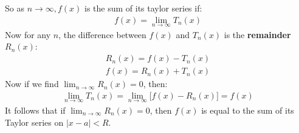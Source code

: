 \documentclass{article}
\begin{document}
So as $n \to \infty, f(x)$ is the sum of its taylor series if:
\begin{gather*}
    f(x) = \lim_{n \to \infty} T_n(x)
\end{gather*}
Now for any $n$, the difference between $f(x)$ and $T_n(x)$ is the \textbf{remainder} $R_n(x)$:
\begin{gather*}
    R_n(x) = f(x) - T_n(x)\\
    f(x) = R_n(x) + T_n(x)
\end{gather*}
Now if we find $\lim_{n \to \infty} R_n(x) = 0$, then:
\begin{gather*}
    \lim_{n \to \infty} T_n(x) = \lim_{n \to \infty}\bigg[f(x) - R_n(x)\bigg] = f(x)
\end{gather*}
It follows that if $\lim_{n \to \infty} R_n(x) = 0$, then $f(x)$ is equal to the sum of its Taylor series on $|x-a| < R$.
\end{document}
